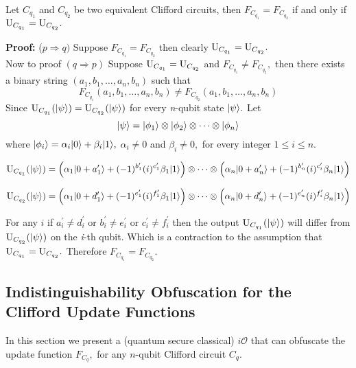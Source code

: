 \begin{lemma}
\label{sec:Clifford Functions Equivalence}
Let $C_{q_1}$ and $C_{q_2}$ be two equivalent Clifford circuits, then $F_{C_{q_1}}=F_{C_{q_2}}$ if and only if ${\rm U}_{C_{q_1}}={\rm U}_{C_{q_2}}.$
\end{lemma}
{\bf Proof:} ($p\Rightarrow q)$ Suppose $F_{C_{q_1}}=F_{C_{q_2}}$ then clearly ${\rm U}_{C_{q_1}}={\rm U}_{C_{q_2}}.$\\

		Now to proof $(q\Rightarrow p)$ Suppose ${\rm U}_{C_{q_1}}={\rm U}_{C_{q_2}}$ and $F_{C_{q_1}}\neq F_{C_{q_2}},$ then there exists a binary string $(a_1,b_1,\ldots, a_n,b_n)$ such that 
		  $$ F_{C_{q_1}}(a_1,b_1,\ldots, a_n,b_n)\neq F_{C_{q_2}}(a_1,b_1,\ldots, a_n,b_n)$$
		  Since ${\rm U}_{C_{q_1}}({{\lvert}\psi\rangle})={\rm U}_{C_{q_2}}({{\lvert}\psi\rangle})$ for every {\em n}-qubit state ${{\lvert}\psi\rangle}.$ Let  $${{\lvert}\psi\rangle}={{\lvert}\phi_1\rangle} \otimes {{\lvert}\phi_2\rangle}\otimes \cdots \otimes {{\lvert}\phi_n\rangle}$$
		   where ${{\lvert}\phi_i\rangle} =\alpha_i {{\lvert}0\rangle}+ \beta_i{{\lvert}1\rangle},$  $\alpha_i\neq 0$ and $\beta_i\neq 0,$ for every integer $1\leq i\leq n.$ 
		  
		  $${\rm U}_{C_{q_1}}({{\lvert}\psi\rangle})=\left(\alpha_1 {{\lvert}0+a^\prime_1\rangle}+(-1)^{b^\prime_1} (i)^{c^\prime_1} \beta_1{{\lvert}1\rangle}\right) \otimes \dots \otimes  \left(\alpha_n {{\lvert}0+a^\prime_n\rangle}+(-1)^{b^\prime_n} (i)^{c^\prime_i} \beta_n{{\lvert}1\rangle}\right)$$
		  
		  $${\rm U}_{C_{q_2}}({{\lvert}\psi\rangle})=\left(\alpha_1 {{\lvert}0+d^\prime_1\rangle}+(-1)^{e^\prime_1} (i)^{f^\prime_1} \beta_1{{\lvert}1\rangle}\right) \otimes \dots  \otimes   \left(\alpha_n {{\lvert}0+d^\prime_n\rangle}+(-1)^{e^\prime_n} (i)^{f^\prime_i} \beta_n{{\lvert}1\rangle}\right)$$
		  
		  For any $i$ if  $a^\prime_i\neq d^\prime_i$ or $b^\prime_i\neq e^\prime_i$ or $c^\prime_i\neq f^\prime_i$ then the output ${\rm U}_{C_{q_1}}({{\lvert}\psi\rangle})$ will differ from ${\rm U}_{C_{q_2}}({{\lvert}\psi\rangle})$ on the {\em i}-th qubit. Which is a contraction to the assumption that ${\rm U}_{C_{q_1}}={\rm U}_{C_{q_2}}.$  Therefore $F_{C_{q_1}}=F_{C_{q_2}}.$



\subsection{Indistinguishability Obfuscation for the Clifford Update Functions}
\label{sec: iO-clifford-functions}
In this section we present a (quantum secure classical) $i\mathcal{O}$ that can obfuscate the update function $F_{C_q},$ for any $n$-qubit Clifford circuit $C_q.$ 

